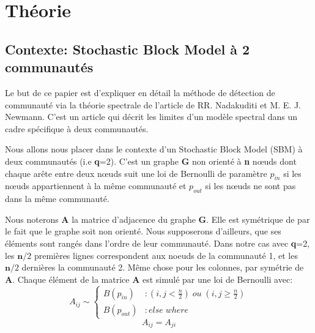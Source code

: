 \section{Théorie}
\subsection{Contexte: Stochastic Block Model à 2 communautés}
Le but de ce papier est d'expliquer en détail la méthode de détection de communauté via la théorie spectrale de l'article de RR. Nadakuditi et M. E. J. Newmann.
C'est un article qui décrit les limites d'un modèle spectral dans un cadre spécifique à deux communautés.

Nous allons nous placer dans le contexte d'un Stochastic Block Model (SBM) à deux communautés (i.e \textbf{q}=2).
C'est un graphe \textbf{G} non orienté à \textbf{n} nœuds dont chaque arête entre deux nœuds suit une loi de Bernoulli de paramètre $p_{in}$ si les nœuds appartiennent à la même communauté et $p_{out}$ si les nœuds ne sont pas dans la même communauté.  

Nous noterons \textbf{A} la matrice d'adjacence du graphe \textbf{G}.
Elle est symétrique de par le fait que le graphe soit non orienté.
Nous supposerons d'ailleurs, que ses éléments sont rangés dans l'ordre de leur communauté.
Dans notre cas avec \textbf{q}=2, les $\mathbf{n}/2$ premières lignes correspondent aux noeuds de la communauté 1, et les $\mathbf{n}/2$ dernières la communauté 2.
Même chose pour les colonnes, par symétrie de \textbf{A}.
Chaque élément de la matrice \textbf{A} est simulé par une loi de Bernoulli avec: 
\begin{equation}\label{rq:probability}
 A_{ij} \sim \left\{
  \begin{array}{lr}
    B(p_{in}) & : (i,j < \frac{n}{2}) \; ou \; (i,j \ge \frac{n}{2}) \\
    B(p_{out}) & : else \; where
  \end{array}
\right.\nonumber
\end{equation}
\begin{equation} 
A_{ij} = A_{ji}\nonumber
\end{equation}


